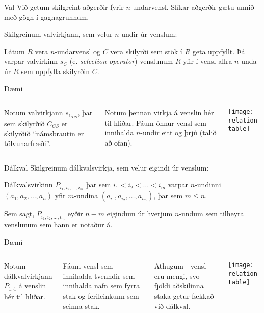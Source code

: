 \documentclass{beamer}
\begin{document}
\begin{frame}{Val}
Við getum skilgreint aðgerðir fyrir $n$-undarvensl. Slíkar aðgerðir gætu unnið með gögn í gagnagrunnum.

\vspace{0.5cm}
Skilgreinum valvirkjann, sem velur $n$-undir úr venslum: 
\begin{tcolorbox}[title=Valvirkinn]
Látum $R$ vera $n$-undarvensl og $C$ vera skilyrði sem stök í $R$ geta uppfyllt. Þá varpar valvirkinn $s_C$ (e. \emph{selection operator}) venslunum $R$ yfir í vensl allra $n$-unda úr $R$ sem uppfylla skilyrðin $C$.
\end{tcolorbox}
\end{frame}

\begin{frame}{Dæmi}
\begin{columns}
Notum valvirkjann $s_{C_{CS}}$, þar sem skilyrðið $C_{CS}$ er skilyrðið ``námsbrautin er tölvunarfræði''.
\vspace{0.5cm}

Notum þennan virkja á venslin hér til hliðar. Fáum önnur vensl sem innihalda $n$-undir eitt og þrjú (talið að ofan).
\begin{center}
\texttt{[image: relation-table]}
\end{center}
\end{columns}
\end{frame}

\begin{frame}{Dálkval}
Skilgreinum dálkvalsvirkja, sem velur eigindi úr venslum:

\begin{tcolorbox}[title=Dálkval]
Dálkvalsvirkinn $P_{i_1, i_2, \ldots, i_m}$ þar sem $i_1 < i_2 < \ldots < i_m$ varpar $n$-undinni $(a_1, a_2, \ldots, a_n)$ yfir $m$-undina $(a_{i_1}, a_{i_2}, \ldots, a_{i_m})$, þar sem $m \leq n$.
\end{tcolorbox}
Sem sagt, $P_{i_1, i_2, \ldots, i_m}$ eyðir $n-m$ eigindum úr hverjum $n$-undum sem tilheyra venslunum sem hann er notaður á.
\end{frame}

\begin{frame}{Dæmi}
\begin{columns}
Notum dálkvalvirkjann $P_{1,4}$ á venslin hér til hliðar.

\vspace{0.5cm}
Fáum vensl sem innihalda tvenndir sem innihalda nafn sem fyrra stak og ferileinkunn sem seinna stak.

\vspace{0.5cm}
Athugum - vensl eru mengi, svo fjöldi aðskilinna staka getur fækkað við dálkval.
\begin{center}
\texttt{[image: relation-table]}
\end{center}
\end{columns}
\end{frame}
\end{document}
